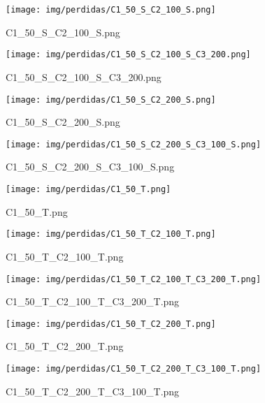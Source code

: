\begin{figure}[H]
    \centerline{\texttt{[image: img/perdidas/C1\_50\_S\_C2\_100\_S.png]}}
    \caption{C1_50_S_C2_100_S.png}
    \label{fig:C1_50_S_C2_100_S.png}
\end{figure}

\begin{figure}[H]
    \centerline{\texttt{[image: img/perdidas/C1\_50\_S\_C2\_100\_S\_C3\_200.png]}}
    \caption{C1_50_S_C2_100_S_C3_200.png}
    \label{fig:C1_50_S_C2_100_S_C3_200.png}
\end{figure}

\begin{figure}[H]
    \centerline{\texttt{[image: img/perdidas/C1\_50\_S\_C2\_200\_S.png]}}
    \caption{C1_50_S_C2_200_S.png}
    \label{fig:C1_50_S_C2_200_S.png}
\end{figure}

\begin{figure}[H]
    \centerline{\texttt{[image: img/perdidas/C1\_50\_S\_C2\_200\_S\_C3\_100\_S.png]}}
    \caption{C1_50_S_C2_200_S_C3_100_S.png}
    \label{fig:C1_50_S_C2_200_S_C3_100_S.png}
\end{figure}

\begin{figure}[H]
    \centerline{\texttt{[image: img/perdidas/C1\_50\_T.png]}}
    \caption{C1_50_T.png}
    \label{fig:C1_50_T.png}
\end{figure}

\begin{figure}[H]
    \centerline{\texttt{[image: img/perdidas/C1\_50\_T\_C2\_100\_T.png]}}
    \caption{C1_50_T_C2_100_T.png}
    \label{fig:C1_50_T_C2_100_T.png}
\end{figure}

\begin{figure}[H]
    \centerline{\texttt{[image: img/perdidas/C1\_50\_T\_C2\_100\_T\_C3\_200\_T.png]}}
    \caption{C1_50_T_C2_100_T_C3_200_T.png}
    \label{fig:C1_50_T_C2_100_T_C3_200_T.png}
\end{figure}

\begin{figure}[H]
    \centerline{\texttt{[image: img/perdidas/C1\_50\_T\_C2\_200\_T.png]}}
    \caption{C1_50_T_C2_200_T.png}
    \label{fig:C1_50_T_C2_200_T.png}
\end{figure}

\begin{figure}[H]
    \centerline{\texttt{[image: img/perdidas/C1\_50\_T\_C2\_200\_T\_C3\_100\_T.png]}}
    \caption{C1_50_T_C2_200_T_C3_100_T.png}
    \label{fig:C1_50_T_C2_200_T_C3_100_T.png}
\end{figure}

